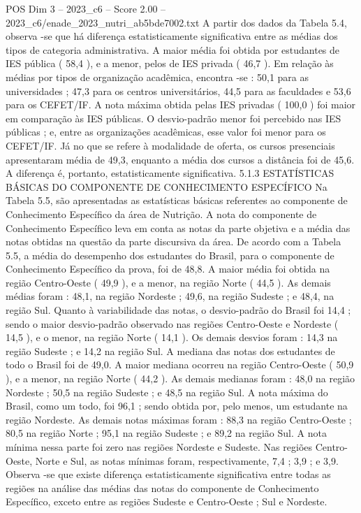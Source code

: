 \begin{textsample}{POS Dim 3 – 2023\_c6 – Score 2.00 – 2023\_c6/enade\_2023\_nutri\_ab5bde7002.txt}
A partir dos dados da Tabela 5.4, observa -se que há diferença estatisticamente significativa entre as médias dos tipos de categoria administrativa.
A maior média foi obtida por estudantes de IES pública ( 58,4 ), e a menor, pelos de IES privada ( 46,7 ).
Em relação às médias por tipos de organização acadêmica, encontra -se : 50,1 para as universidades ; 47,3 para os centros universitários, 44,5 para as faculdades e 53,6 para os CEFET/IF.
A nota máxima obtida pelas IES privadas ( 100,0 ) foi maior em comparação às IES públicas.
O desvio-padrão menor foi percebido nas IES públicas ; e, entre as organizações acadêmicas, esse valor foi menor para os CEFET/IF.
Já no que se refere à modalidade de oferta, os cursos presenciais apresentaram média de 49,3, enquanto a média dos cursos a distância foi de 45,6.
A diferença é, portanto, estatisticamente significativa. 5.1.3 ESTATÍSTICAS BÁSICAS DO COMPONENTE DE CONHECIMENTO ESPECÍFICO Na Tabela 5.5, são apresentadas as estatísticas básicas referentes ao componente de Conhecimento Específico da área de Nutrição.
A nota do componente de Conhecimento Específico leva em conta as notas da parte objetiva e a média das notas obtidas na questão da parte discursiva da área.
De acordo com a Tabela 5.5, a média do desempenho dos estudantes do Brasil, para o componente de Conhecimento Específico da prova, foi de 48,8.
A maior média foi obtida na região Centro-Oeste ( 49,9 ), e a menor, na região Norte ( 44,5 ).
As demais médias foram : 48,1, na região Nordeste ; 49,6, na região Sudeste ; e 48,4, na região Sul.
Quanto à variabilidade das notas, o desvio-padrão do Brasil foi 14,4 ; sendo o maior desvio-padrão observado nas regiões Centro-Oeste e Nordeste ( 14,5 ), e o menor, na região Norte ( 14,1 ).
Os demais desvios foram : 14,3 na região Sudeste ; e 14,2 na região Sul.
A mediana das notas dos estudantes de todo o Brasil foi de 49,0.
A maior mediana ocorreu na região Centro-Oeste ( 50,9 ), e a menor, na região Norte ( 44,2 ).
As demais medianas foram : 48,0 na região Nordeste ; 50,5 na região Sudeste ; e 48,5 na região Sul.
A nota máxima do Brasil, como um todo, foi 96,1 ; sendo obtida por, pelo menos, um estudante na região Nordeste.
As demais notas máximas foram : 88,3 na região Centro-Oeste ; 80,5 na região Norte ; 95,1 na região Sudeste ; e 89,2 na região Sul.
A nota mínima nessa parte foi zero nas regiões Nordeste e Sudeste.
Nas regiões Centro-Oeste, Norte e Sul, as notas mínimas foram, respectivamente, 7,4 ; 3,9 ; e 3,9.
Observa -se que existe diferença estatisticamente significativa entre todas as regiões na análise das médias das notas do componente de Conhecimento Específico, exceto entre as regiões Sudeste e Centro-Oeste ; Sul e Nordeste.

\end{textsample}
